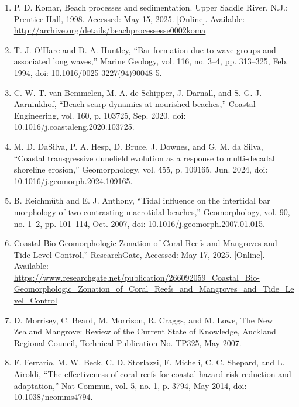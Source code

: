 \documentclass{article}
\begin{document}
\begin{sloppypar}
\begin{enumerate}
    \item{P. D. Komar, Beach processes and sedimentation. Upper Saddle River, N.J.: Prentice Hall, 1998. Accessed: May 15, 2025. [Online]. Available: \url{http://archive.org/details/beachprocessesse0002koma}}


    \item{T. J. O’Hare and D. A. Huntley, “Bar formation due to wave groups and associated long waves,” Marine Geology, vol. 116, no. 3–4, pp. 313–325, Feb. 1994, doi: 10.1016/0025-3227(94)90048-5.}

    \item{C. W. T. van Bemmelen, M. A. de Schipper, J. Darnall, and S. G. J. Aarninkhof, “Beach scarp dynamics at nourished beaches,” Coastal Engineering, vol. 160, p. 103725, Sep. 2020, doi: 10.1016/j.coastaleng.2020.103725.}

    \item{M. D. DaSilva, P. A. Hesp, D. Bruce, J. Downes, and G. M. da Silva, “Coastal transgressive dunefield evolution as a response to multi-decadal shoreline erosion,” Geomorphology, vol. 455, p. 109165, Jun. 2024, doi: 10.1016/j.geomorph.2024.109165.}

    \item{B. Reichmüth and E. J. Anthony, “Tidal influence on the intertidal bar morphology of two contrasting macrotidal beaches,” Geomorphology, vol. 90, no. 1–2, pp. 101–114, Oct. 2007, doi: 10.1016/j.geomorph.2007.01.015.}

    \item{Coastal Bio-Geomorphologic Zonation of Coral Reefs and Mangroves and Tide Level Control,” ResearchGate, Accessed: May 17, 2025. [Online]. Available: \url{https://www.researchgate.net/publication/266092059_Coastal_Bio-Geomorphologic_Zonation_of_Coral_Reefs_and_Mangroves_and_Tide_Level_Control}}

    \item{D. Morrisey, C. Beard, M. Morrison, R. Craggs, and M. Lowe, The New Zealand Mangrove: Review of the Current State of Knowledge, Auckland Regional Council, Technical Publication No. TP325, May 2007.}

    \item{F. Ferrario, M. W. Beck, C. D. Storlazzi, F. Micheli, C. C. Shepard, and L. Airoldi, “The effectiveness of coral reefs for coastal hazard risk reduction and adaptation,” Nat Commun, vol. 5, no. 1, p. 3794, May 2014, doi: 10.1038/ncomms4794.}


\end{enumerate}
\end{sloppypar}
\end{document}

